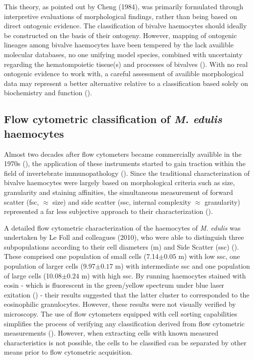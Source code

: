 This theory, as pointed out by Cheng (1984), was primarily formulated through interpretive evaluations of morphological findings, rather than being based on direct ontogenic evidence. The classification of bivalve haemocytes should ideally be constructed on the basis of their ontogeny. However, mapping of ontogenic lineages among bivalve haemocytes have been tempered by the lack availible molecular databases, no one unifying model species, combined with uncertainty regarding the hematompoietic tissue(s) and processes of bivalves (\cite{Hine1999, Smith2016, Pila2016, delaBallina2022}). With no real ontogenic evidence to work with, a careful assessment of availible morphological data may represent a better alternative relative to a classification based solely on biochemistry and function (\cite{Hine1999}). 

\subsection{Flow cytometric classification of \emph{M. edulis} haemocytes}
Almost two decades after flow cytometers became commercially availible in the 1970s (\cite{Shapiro2004}), the application of these instruments started to gain traction within the field of invertebrate immunopathology (\cite{Fisher1988}). Since the traditional characterization of bivalve haemocytes were largely based on morphological criteria such as size, granularity and staining affinities, the simultaneous measurement of forward scatter (\acrshort{fsc}, $\approx$ size) and side scatter (\acrshort{ssc}, internal complexity $\approx$ granularity) represented a far less subjective approach to their characterization (\cite{AshtonAlcox1998, Allam2002, Mateo2009}).

A detailed flow cytometric characterization of the haemocytes of \emph{M. edulis} was undertaken by Le Foll and colleagues (2010), who were able to distinguish three subpopulations according to their cell diameters (\micro m) and Side Scatter (\acrshort{ssc}) (\cite{LeFoll2010}). These comprised one population of small cells (7.14$\pm{0.05}$ \micro m) with low \acrshort{ssc}, one population of larger cells (9.97$\pm{0.17}$ \micro m) with intermediate \acrshort{ssc} and one population of large cells (10.08$\pm{0.24}$ \micro m) with high \acrshort{ssc}. By running haemocytes stained with eosin - which is fluorescent in the green/yellow spectrum under blue laser exitation (\cite{Elfer2016, Koegle2020}) - their results suggested that the latter cluster to corresponded to the eosinophilic granulocytes. However, these results were not visually verified by microscopy. The use of flow cytometers equipped with cell sorting capabilities simplifies the process of verifying any classification derived from flow cytometric measurements (\cite{Shapiro2004}). However, when extracting cells with known measured characteristics is not possible, the cells to be classified can be separated by other means prior to flow cytometric acquisition.

